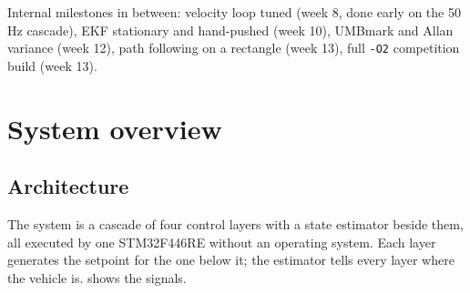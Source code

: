 \documentclass[11pt,a4paper]{article}
\newcommand{\code}[1]{\texttt{\small #1}}
\begin{document}
Internal milestones in between: velocity loop tuned (week 8, done early on the
50\,Hz cascade), EKF stationary and hand-pushed (week 10), UMBmark and Allan
variance (week 12), path following on a  rectangle
(week 13), full \code{-O2} competition build (week 13).
\clearpage
\section{System overview}\label{sec:overview}

\subsection{Architecture}

The system is a cascade of four control layers with a state estimator beside
them, all executed by one STM32F446RE without an operating system. Each layer
generates the setpoint for the one below it; the estimator tells every layer
where the vehicle is.  shows the signals.
\end{document}
